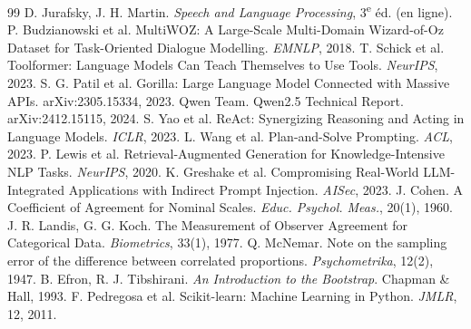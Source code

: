 \documentclass[10pt,a4paper]{article}
\begin{document}
\begingroup
\footnotesize
\setlength{\itemsep}{0pt}
\renewcommand{\refname}{\large\color{vertfonce}Références}
\begin{thebibliography}{99}\setlength{\itemsep}{0pt}\setlength{\parskip}{0pt}
 D. Jurafsky, J. H. Martin. \emph{Speech and Language Processing}, 3\textsuperscript{e} éd. (en ligne).
 P. Budzianowski et al. MultiWOZ: A Large-Scale Multi-Domain Wizard-of-Oz Dataset for Task-Oriented Dialogue Modelling. \emph{EMNLP}, 2018.
 T. Schick et al. Toolformer: Language Models Can Teach Themselves to Use Tools. \emph{NeurIPS}, 2023.
 S. G. Patil et al. Gorilla: Large Language Model Connected with Massive APIs. arXiv:2305.15334, 2023.
 Qwen Team. Qwen2.5 Technical Report. arXiv:2412.15115, 2024.
 S. Yao et al. ReAct: Synergizing Reasoning and Acting in Language Models. \emph{ICLR}, 2023.
 L. Wang et al. Plan-and-Solve Prompting. \emph{ACL}, 2023.
 P. Lewis et al. Retrieval-Augmented Generation for Knowledge-Intensive NLP Tasks. \emph{NeurIPS}, 2020.
 K. Greshake et al. Compromising Real-World LLM-Integrated Applications with Indirect Prompt Injection. \emph{AISec}, 2023.
 J. Cohen. A Coefficient of Agreement for Nominal Scales. \emph{Educ. Psychol. Meas.}, 20(1), 1960.
 J. R. Landis, G. G. Koch. The Measurement of Observer Agreement for Categorical Data. \emph{Biometrics}, 33(1), 1977.
 Q. McNemar. Note on the sampling error of the difference between correlated proportions. \emph{Psychometrika}, 12(2), 1947.
 B. Efron, R. J. Tibshirani. \emph{An Introduction to the Bootstrap}. Chapman \& Hall, 1993.
 F. Pedregosa et al. Scikit-learn: Machine Learning in Python. \emph{JMLR}, 12, 2011.
\end{thebibliography}
\endgroup
\end{document}
